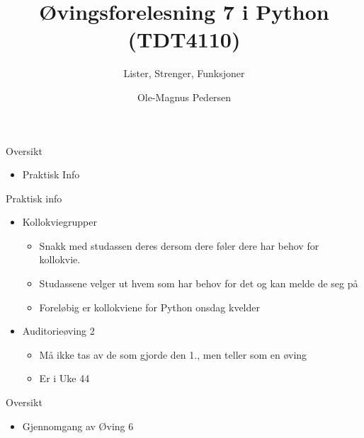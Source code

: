 \documentclass[screen, aspectratio=169]{beamer}
\title[Short title]{Øvingsforelesning 7 i Python (TDT4110)}
\subtitle{Lister, Strenger, Funksjoner}
\author[Ole-Magnus Pedersen]{Ole-Magnus Pedersen}
\institute[NTNU]{}
\date{}
\begin{document}
\begin{frame}
  \titlepage
\end{frame}


\begin{frame}{Oversikt}
	\begin{itemize}
		\item Praktisk Info
	\end{itemize}
\end{frame}

\begin{frame}{Praktisk info}
	\begin{itemize}
		
		\item Kollokviegrupper
		\begin{itemize}
			\item Snakk med studassen deres dersom dere føler dere har behov for kollokvie. 
			\item Studassene velger ut hvem som har behov for det og kan melde de seg på
			\item Foreløbig er kollokviene for Python onsdag kvelder
		\end{itemize}
		\item Auditorieøving 2
		\begin{itemize}
		    \item Må ikke tas av de som gjorde den 1., men teller som en øving
		    \item Er i Uke 44
		\end{itemize}
	\end{itemize}
\end{frame}



\begin{frame}{Oversikt}
	\begin{itemize}
		\item Gjennomgang av Øving 6
	\end{itemize}
\end{frame}
\end{document}

